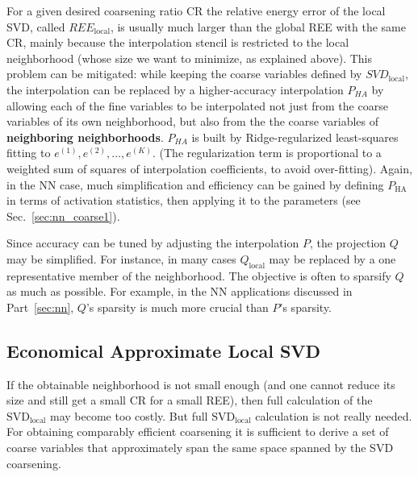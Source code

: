 \documentclass{article} %
\begin{document}
For a given desired coarsening ratio CR the relative energy error of the local SVD, called $REE_{\text{local}}$, is usually much larger than the global REE with the same CR, mainly because the interpolation stencil is restricted to the local neighborhood (whose size we want to minimize, as explained above). This problem can be mitigated: while keeping the coarse variables defined by $SVD_{\text{local}}$, the interpolation can be replaced by a higher-accuracy interpolation $P_{HA}$ by allowing each of the fine variables to be interpolated not just from the coarse variables of its own neighborhood, but also from the the coarse variables of \textbf{neighboring neighborhoods}. $P_{HA}$ is built by Ridge-regularized least-squares fitting to $e^{(1)}, e^{(2)}, \dots, e^{(K)}$. (The regularization term is proportional to a weighted sum of squares of interpolation coefficients, to avoid over-fitting). Again, in the NN case, much simplification and efficiency can be gained by defining $P_{\text{HA}}$ in terms of activation statistics, then applying it to the parameters (see Sec.~\ref{sec:nn_coarse1}).

Since accuracy can be tuned by adjusting the interpolation $P$, the projection $Q$ may be simplified. For instance, in many cases $Q_{\text{local}}$ may be replaced by a one representative member of the neighborhood. The objective is often to sparsify $Q$ as much as possible. For example, in the NN applications discussed in Part~\ref{sec:nn}, $Q$'s sparsity is much more crucial than $P$'s sparsity.

\subsection{Economical Approximate Local SVD}
\label{sec:econonmical_svd}
If the obtainable neighborhood is not small enough (and one cannot reduce its size and still get a small CR for a small REE), then full calculation of the $\text{SVD}_{\text{local}}$ may become too costly. But full $\text{SVD}_{\text{local}}$ calculation is not really needed. For obtaining comparably efficient coarsening it is sufficient to derive a set of coarse variables that approximately span the same space spanned by the SVD coarsening.
\end{document}
